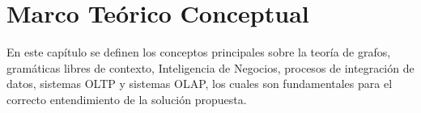 \chapter{Marco Te\'orico Conceptual}\label{chapter:teoricframe}

En este cap\'itulo se definen los conceptos principales sobre la teoría de grafos, gram\'aticas 
libres de contexto, Inteligencia de Negocios, procesos de integración de datos, sistemas OLTP y sistemas OLAP, 
los cuales son fundamentales para el correcto entendimiento de la soluci\'on propuesta.


